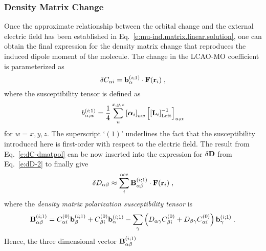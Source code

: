 \documentclass[aip,jcp,preprint,amsmath,amssymb,floatfix]{revtex4-1}
\newcommand{\BM}[1]{\bm{#1}}
\begin{document}
\subsubsection{Density Matrix Change}

Once the approximate relationship between the orbital change and the external electric field
has been established in Eq.~\eqref{e:mu-ind.matrix.linear.solution},
one can obtain the final expression for the density matrix change 
that reproduces the induced dipole moment of the molecule.
The change in the LCAO\hyp{}MO coefficient is parameterized as
%
\begin{equation} \label{e:dC-dmatpol}
 \delta C_{\alpha i} = {\bf b}_{\alpha}^{(i;1)} \cdot {\bf F}({\bf r}_i)  \;,
\end{equation}
%
where the susceptibility tensor is defined as
%
\begin{equation} \label{e:susceptibility-b}
  b_{\alpha;w}^{(i;1)}= \frac{1}{4} \sum_u^{x, y, z} \left[ {\BM{\alpha}}_i \right]_{uw}
   \left[ \left[ {\bf L}_i  \right]^{-1}_{\rm Left} \right]_{u;\alpha}  
\end{equation}
%
for $w=x,y,z$. 
The superscript `$(1)$' underlines the fact that the susceptibility introduced here
is first\hyp{}order with respect to the electric field.
The result from Eq.~\eqref{e:dC-dmatpol} can be now inserted into 
the expression for $\delta {\bf D}$ from Eq.~\eqref{e:dD-2} to finally give
%
\begin{equation}\label{e:final-model.HF}
 \delta D_{\alpha\beta} \approx \sum_i^{\rm occ} {\bf B}^{(i;1)}_{\alpha\beta} \cdot {\bf F}({\bf r}_i)  \;,
\end{equation}
%
where the \emph{density matrix polarization susceptibility tensor} is
%
\begin{equation}  \label{e:susceptibility-B}
 {\bf B}^{(i;1)}_{\alpha\beta} = 
                               C_{\alpha i}^{(0)} {\bf b}_{\beta}^{(i;1)} + C_{\beta i}^{(0)} {\bf b}_\alpha^{(i;1)} %
                                - \sum_\gamma 
                                 \left( 
               D_{\alpha\gamma} C_{\beta i}^{(0)} + D_{\beta\gamma} C_{\alpha i}^{(0)}
                                 \right)
                                           {\bf b}_{\gamma}^{(i;1)}
 \;.
\end{equation}
%
Hence, the three dimensional vector ${\bf B}^{(i;1)}_{\alpha\beta}$ 
\end{document}
